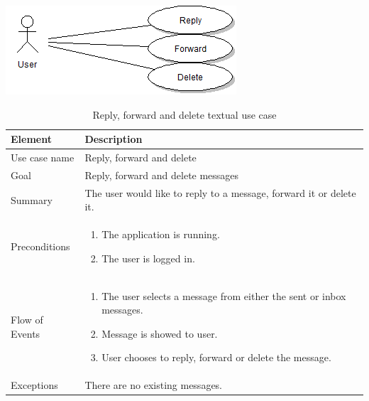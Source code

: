 \begin{table}
\begin{center}
\begin{center}
\includegraphics[width=\textwidth]{reply_forward_delete}
\end{center}
\begin{tabular}{p{3cm}|p{12cm}} \hline
\textbf{Element} & \textbf{Description} \\ \hline \hline
Use case name & Reply, forward and delete \\
Goal & Reply, forward and delete messages\\
Summary & The user would like to reply to a message, forward it or delete it. \\
Preconditions &
\begin{enumerate}
\item{}The application is running.
\item{}The user is logged in.
\end{enumerate} \\ \hline
Flow of Events &
\begin{enumerate}
\item{}The user selects a message from either the sent or inbox messages.
\item{}Message is showed to user.
\item{}User chooses to reply, forward or delete the message. 
\end{enumerate} \\ \hline
Exceptions & There are no existing messages.\\ \hline
\end{tabular}
\end{center}
\caption{Reply, forward and delete textual use case} \label{tab:reply}
\end{table}

